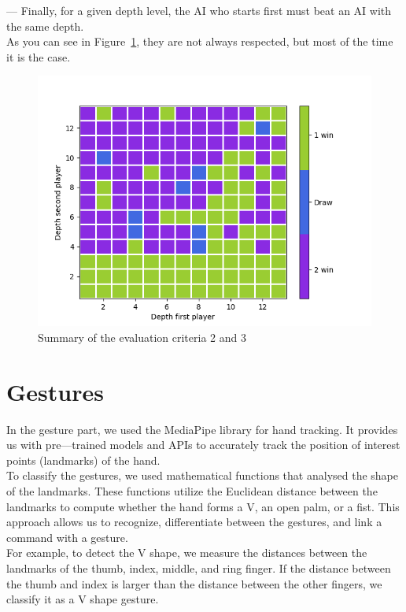 \documentclass[11pt, a4paper, oneside]{report}
\begin{document}
	— Finally, for a given depth level, the AI who starts first must beat an AI with the same depth. \\

	As you can see in Figure~\ref{fig:summary_criteria}, they are not always respected, but most of the time it is the case.
	\begin{figure}[ht]
		\includegraphics[scale=0.7]{result_criteria.png}
		\centering
		\caption{Summary of the evaluation criteria 2 and 3}\label{fig:summary_criteria}
	\end{figure}

	\section{Gestures}
	In the gesture part, we used the MediaPipe library for hand tracking. It provides us with pre—trained models and APIs to accurately track the position of interest points (landmarks) of the hand. \\

	To classify the gestures, we used mathematical functions that analysed the shape of the landmarks. These functions utilize the Euclidean distance between the landmarks to compute whether the hand forms a V, an open palm, or a fist. This approach allows us to recognize, differentiate between the gestures, and link a command with a gesture. \\
	For example, to detect the V shape, we measure the distances between the landmarks of the thumb, index, middle, and ring finger. If the distance between the thumb and index is larger than the distance between the other fingers, we classify it as a V shape gesture. \\
\end{document}
